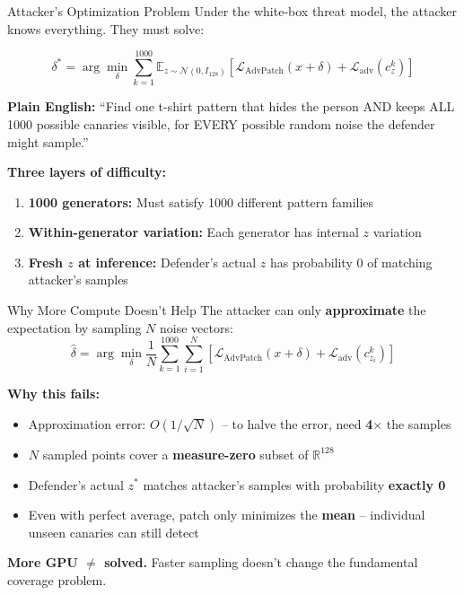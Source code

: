 \documentclass[aspectratio=169,11pt]{beamer}
\begin{document}
\begin{frame}{Attacker's Optimization Problem}
Under the white-box threat model, the attacker knows everything. They must solve:

\begin{equation*}
    \delta^* = \arg\min_\delta \sum_{k=1}^{1000} \mathbb{E}_{z \sim \mathcal{N}(0, I_{128})} \left[ \mathcal{L}_{\text{AdvPatch}}(x + \delta) + \mathcal{L}_{\text{adv}}(c^k_z) \right]
\end{equation*}

\vspace{0.3cm}
\textbf{Plain English:} ``Find one t-shirt pattern that hides the person AND keeps ALL 1000 possible canaries visible, for EVERY possible random noise the defender might sample.''

\vspace{0.3cm}
\textbf{Three layers of difficulty:}
\begin{enumerate}
    \item \textbf{1000 generators:} Must satisfy 1000 different pattern families
    \item \textbf{Within-generator variation:} Each generator has internal $z$ variation
    \item \textbf{Fresh $z$ at inference:} Defender's actual $z$ has probability 0 of matching attacker's samples
\end{enumerate}
\end{frame}

\begin{frame}{Why More Compute Doesn't Help}
The attacker can only \textbf{approximate} the expectation by sampling $N$ noise vectors:
\begin{equation*}
    \hat{\delta} = \arg\min_\delta \frac{1}{N} \sum_{k=1}^{1000} \sum_{i=1}^{N} \left[ \mathcal{L}_{\text{AdvPatch}}(x + \delta) + \mathcal{L}_{\text{adv}}(c^k_{z_i}) \right]
\end{equation*}

\vspace{0.3cm}
\textbf{Why this fails:}
\begin{itemize}
    \item Approximation error: $O(1/\sqrt{N})$ -- to halve the error, need \textbf{4$\times$} the samples
    \item $N$ sampled points cover a \textbf{measure-zero} subset of $\mathbb{R}^{128}$
    \item Defender's actual $z^*$ matches attacker's samples with probability \textbf{exactly 0}
    \item Even with perfect average, patch only minimizes the \textbf{mean} -- individual unseen canaries can still detect
\end{itemize}

\vspace{0.3cm}
\textbf{More GPU $\neq$ solved.} Faster sampling doesn't change the fundamental coverage problem.
\end{frame}
\end{document}
